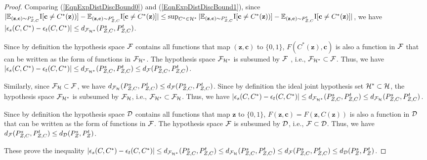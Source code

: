 \documentclass[letterpaper]{article} \usepackage{aaai20}  \usepackage{times}  \usepackage{helvet} \usepackage{courier}  \usepackage[hyphens]{url}  \usepackage{graphicx} \urlstyle{rm} \def\UrlFont{\rm}  \usepackage{graphicx}  \frenchspacing  \setlength{\pdfpagewidth}{8.5in}  \setlength{\pdfpageheight}{11in}
\begin{document}
\begin{proof}
	Comparing (\ref{EqnExpDistDiscBound0}) and (\ref{EqnExpDistDiscBound1}), since $|\mathbb{E}_{(\mathbf{z}, \mathbf{c}) \sim P_{Z, C}^s} {\rm I} [\mathbf{c} \ne C^*(\mathbf{z}))] - \mathbb{E}_{(\mathbf{z}, \mathbf{c}) \sim P_{Z, C}^t} {\rm I} [ \mathbf{c} \ne C^*(\mathbf{z})]| \le \sup_{C^* \in {\cal{H}}^*} |\mathbb{E}_{(\mathbf{z}, \mathbf{c}) \sim P_{Z, C}^s} {\rm I} [\mathbf{c} \ne C^*(\mathbf{z}))] - \mathbb{E}_{(\mathbf{z}, \mathbf{c}) \sim P_{Z, C}^t} {\rm I} [ \mathbf{c} \ne C^*(\mathbf{z})]|$, we have $|\epsilon_s(C, C^*) - \epsilon_t(C, C^*)| \le d_{{\cal{F}}_{{\cal{H}}^*}} (P_{Z, C}^s, P_{Z, C}^t)$.
	
	Since by definition the hypothesis space $\cal{F}$ contains all functions that map $(\mathbf{z}, \mathbf{c})$ to $\{0, 1\}$, $F(C^*(\mathbf{z}), \mathbf{c})$ is also a function in $\cal{F}$ that can be written as the form of functions in ${\cal{F}}_{{\cal{H}}^*}$. The hypothesis space ${\cal{F}}_{{\cal{H}}^*}$ is subsumed by $\cal{F}$ , i.e., ${\cal{F}}_{{\cal{H}}^*} \subset \cal{F}$. Thus, we have $|\epsilon_s(C, C^*) - \epsilon_t(C, C^*)| \le d_{{\cal{F}}_{{\cal{H}}^*}} (P_{Z, C}^s, P_{Z, C}^t) \le d_{\cal{F}} (P_{Z, C}^s, P_{Z, C}^t)$.
	
	Similarly, since ${\cal{F}}_{\cal{H}} \subset \cal{F}$, we have $d_{{\cal{F}}_{\cal{H}}} (P_{Z, C}^s, P_{Z, C}^t) \le d_{\cal{F}} (P_{Z, C}^s, P_{Z, C}^t)$. Since by definition the ideal joint hypothesis set ${\cal{H}}^* \subset \cal{H}$, the hypothesis space ${\cal{F}}_{{\cal{H}}^*}$ is subsumed by ${\cal{F}}_{\cal{H}}$, i.e., ${\cal{F}}_{{\cal{H}}^*} \subset {\cal{F}}_{\cal{H}}$. Thus, we have $|\epsilon_s(C, C^*) - \epsilon_t(C, C^*)| \le d_{{\cal{F}}_{{\cal{H}}^*}} (P_{Z, C}^s, P_{Z, C}^t) \le d_{{\cal{F}}_{\cal{H}}} (P_{Z, C}^s, P_{Z, C}^t)$. 
	
	Since by definition the hypothesis space $\cal{D}$ contains all functions that map $\mathbf{z}$ to $\{0, 1\}$, $F(\mathbf{z}, \mathbf{c})=F(\mathbf{z}, C(\mathbf{z}))$ is also a function in $\cal{D}$ that can be written as the form of functions in $\cal{F}$. The hypothesis space $\cal{F}$ is subsumed by $\cal{D}$, i.e., $ \cal{F} \subset \cal{D}$. Thus, we have $d_{\cal{F}} (P_{Z, C}^s, P_{Z, C}^t) \le d_{\cal{D}} (P_{Z}^s, P_{Z}^t)$.
	
	These prove the inequality $|\epsilon_s(C, C^*) - \epsilon_t(C, C^*)| \le d_{{\cal{F}}_{{\cal{H}}^*}} (P_{Z, C}^s, P_{Z, C}^t) \le d_{{\cal{F}}_{\cal{H}}} (P_{Z, C}^s, P_{Z, C}^t) \le d_{\cal{F}} (P_{Z, C}^s, P_{Z, C}^t) \le d_{\cal{D}} (P_{Z}^s, P_{Z}^t)$.
\end{proof}
\end{document}
